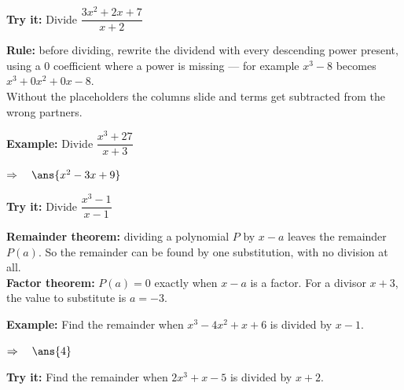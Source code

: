 \documentclass[12pt]{article}
\begin{document}
\begin{tryitbox}
\textbf{Try it:} \quad Divide $\dfrac{3x^{2} + 2x + 7}{x + 2}$\\[2pt]
\end{tryitbox}


\begin{formulabox}
\textbf{Rule:} before dividing, rewrite the dividend with every descending power
present, using a $0$ coefficient where a power is missing --- for example
$x^{3} - 8$ becomes $x^{3} + 0x^{2} + 0x - 8$.\\[3pt]
Without the placeholders the columns slide and terms get subtracted from the
wrong partners.
\end{formulabox}

\begin{examplebox}
\textbf{Example:} \quad Divide $\dfrac{x^{3} + 27}{x + 3}$

$\Rightarrow\quad \ans{x^2 - 3x + 9}$
\end{examplebox}

\begin{tryitbox}
\textbf{Try it:} \quad Divide $\dfrac{x^{3} - 1}{x - 1}$\\[2pt]
\end{tryitbox}


\begin{formulabox}
\textbf{Remainder theorem:} dividing a polynomial $P$ by $x - a$ leaves the
remainder $P(a)$. So the remainder can be found by one substitution, with no
division at all.\\[3pt]
\textbf{Factor theorem:} $P(a) = 0$ exactly when $x - a$ is a factor. For a
divisor $x + 3$, the value to substitute is $a = -3$.
\end{formulabox}

\begin{examplebox}
\textbf{Example:} \quad Find the remainder when $x^{3} - 4x^{2} + x + 6$ is
divided by $x - 1$.

$\Rightarrow\quad \ans{4}$
\end{examplebox}

\begin{tryitbox}
\textbf{Try it:} \quad Find the remainder when $2x^{3} + x - 5$ is divided by
$x + 2$.\\[2pt]
\end{tryitbox}
\end{document}
